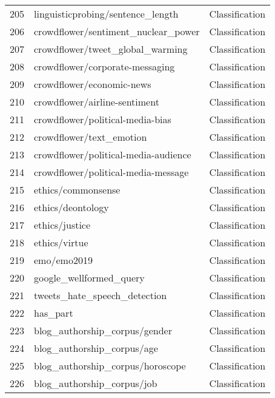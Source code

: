 \documentclass[11pt]{article}
\begin{document}
\begin{longtable}{lll}
205 & linguisticprobing/sentence\_length \citep{conneau-etal-2018-cram} & Classification \\
206 & crowdflower/sentiment\_nuclear\_power \citep{van2012designing} & Classification \\
207 & crowdflower/tweet\_global\_warming \citep{van2012designing} & Classification \\
208 & crowdflower/corporate-messaging \citep{van2012designing} & Classification \\
209 & crowdflower/economic-news \citep{van2012designing} & Classification \\
210 & crowdflower/airline-sentiment \citep{van2012designing} & Classification \\
211 & crowdflower/political-media-bias \citep{van2012designing} & Classification \\
212 & crowdflower/text\_emotion \citep{van2012designing} & Classification \\
213 & crowdflower/political-media-audience \citep{van2012designing} & Classification \\
214 & crowdflower/political-media-message \citep{van2012designing} & Classification \\
215 & ethics/commonsense \citep{hendrycks2020ethics} & Classification \\
216 & ethics/deontology \citep{hendrycks2020ethics} & Classification \\
217 & ethics/justice \citep{hendrycks2020ethics} & Classification \\
218 & ethics/virtue \citep{hendrycks2020ethics} & Classification \\
219 & emo/emo2019 \citep{chatterjee-etal-2019-semeval} & Classification \\
220 & google\_wellformed\_query \citep{faruqui2018identifying} & Classification \\
221 & tweets\_hate\_speech\_detection \citep{ZRoshanSharma:dataset} & Classification \\
222 & has\_part \citep{bhakthavatsalam2020dogs} & Classification \\
223 & blog\_authorship\_corpus/gender \citep{schler2006effects} & Classification \\
224 & blog\_authorship\_corpus/age \citep{schler2006effects} & Classification \\
225 & blog\_authorship\_corpus/horoscope \citep{schler2006effects} & Classification \\
226 & blog\_authorship\_corpus/job \citep{schler2006effects} & Classification \\

\end{longtable}
\end{document}
